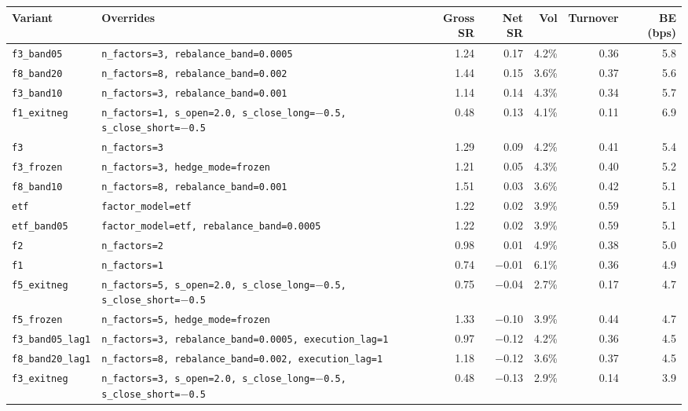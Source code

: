 \begin{longtable}{@{}l>{\raggedright\arraybackslash\footnotesize}p{4.4cm}rrrrr@{}}
\toprule
Variant & Overrides & Gross SR & Net SR & Vol & Turnover & BE (bps)\\
\midrule
\endhead
\texttt{f3\_band05} & \texttt{n\_factors=3, rebalance\_band=0.0005} & 1.24 & 0.17 & 4.2\% & 0.36 & 5.8\\
\texttt{f8\_band20} & \texttt{n\_factors=8, rebalance\_band=0.002} & 1.44 & 0.15 & 3.6\% & 0.37 & 5.6\\
\texttt{f3\_band10} & \texttt{n\_factors=3, rebalance\_band=0.001} & 1.14 & 0.14 & 4.3\% & 0.34 & 5.7\\
\texttt{f1\_exitneg} & \texttt{n\_factors=1, s\_open=2.0, s\_close\_long=\ensuremath{-}0.5, s\_close\_short=\ensuremath{-}0.5} & 0.48 & 0.13 & 4.1\% & 0.11 & 6.9\\
\texttt{f3} & \texttt{n\_factors=3} & 1.29 & 0.09 & 4.2\% & 0.41 & 5.4\\
\texttt{f3\_frozen} & \texttt{n\_factors=3, hedge\_mode=frozen} & 1.21 & 0.05 & 4.3\% & 0.40 & 5.2\\
\texttt{f8\_band10} & \texttt{n\_factors=8, rebalance\_band=0.001} & 1.51 & 0.03 & 3.6\% & 0.42 & 5.1\\
\texttt{etf} & \texttt{factor\_model=etf} & 1.22 & 0.02 & 3.9\% & 0.59 & 5.1\\
\texttt{etf\_band05} & \texttt{factor\_model=etf, rebalance\_band=0.0005} & 1.22 & 0.02 & 3.9\% & 0.59 & 5.1\\
\texttt{f2} & \texttt{n\_factors=2} & 0.98 & 0.01 & 4.9\% & 0.38 & 5.0\\
\texttt{f1} & \texttt{n\_factors=1} & 0.74 & \ensuremath{-}0.01 & 6.1\% & 0.36 & 4.9\\
\texttt{f5\_exitneg} & \texttt{n\_factors=5, s\_open=2.0, s\_close\_long=\ensuremath{-}0.5, s\_close\_short=\ensuremath{-}0.5} & 0.75 & \ensuremath{-}0.04 & 2.7\% & 0.17 & 4.7\\
\texttt{f5\_frozen} & \texttt{n\_factors=5, hedge\_mode=frozen} & 1.33 & \ensuremath{-}0.10 & 3.9\% & 0.44 & 4.7\\
\texttt{f3\_band05\_lag1} & \texttt{n\_factors=3, rebalance\_band=0.0005, execution\_lag=1} & 0.97 & \ensuremath{-}0.12 & 4.2\% & 0.36 & 4.5\\
\texttt{f8\_band20\_lag1} & \texttt{n\_factors=8, rebalance\_band=0.002, execution\_lag=1} & 1.18 & \ensuremath{-}0.12 & 3.6\% & 0.37 & 4.5\\
\texttt{f3\_exitneg} & \texttt{n\_factors=3, s\_open=2.0, s\_close\_long=\ensuremath{-}0.5, s\_close\_short=\ensuremath{-}0.5} & 0.48 & \ensuremath{-}0.13 & 2.9\% & 0.14 & 3.9\\

\end{longtable}
